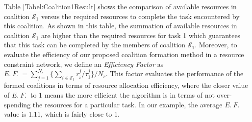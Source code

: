 \documentclass[conference]{IEEEtran}
\theoremstyle{remark}
\theoremstyle{lemma}
\begin{document}
Table \ref{Tabel:Coalition1Result} shows the comparison of available resources in coalition $\mathcal{S}_1$ versus the required resources to complete the task encountered by this coalition. As shown in this table, the summation of available resources in coalition $\mathcal{S}_1$ are higher than the required resources for task 1 which guarantees that this task can be completed by the members of coalition $\mathcal{S}_1$. 
Moreover, to evaluate the efficiency of our proposed coalition formation method in a resource constraint network, we define an \emph{Efficiency Factor} as $E.~F.~ = \sum_{j = 1}^{N_r}\{\sum_{i \in \mathcal{S}_1}{r_i^j} / \tau_1^j\}/{N_r}$. This factor evaluates the performance of the formed coalitions in terms of resource allocation efficiency, where the closer value of $E.~F.~$ to 1 means the more efficient the algorithm is in terms of not over-spending the resources for a particular task. In our example, the average $E.~F.~$ value is 1.11, which is fairly close to 1.
\end{document}
